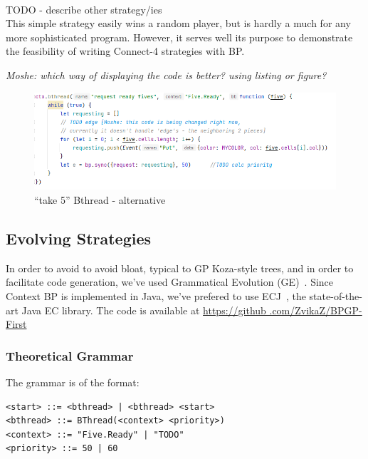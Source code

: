 \documentclass{article}
\begin{document}
    {~\\ \large TODO - describe other strategy/ies}\\

This simple strategy easily wins a random player, but is hardly a much for any more sophisticated program. However, 
it serves well its purpose to demonstrate the feasibility of writing Connect-4 strategies with BP. 

\emph{Moshe: which way of displaying the code is better? using \emph{listing} or \emph{figure}?}



\begin{figure}[h]
    \includegraphics[width=\textwidth]{five_bt}
    \caption{``take 5'' Bthread - alternative}
    \label{fig:take-5-bt-fig}
\end{figure}


\subsection{Evolving Strategies}
In order to avoid to avoid bloat, typical to GP Koza-style trees, and in order to facilitate code generation, we've
used Grammatical Evolution (GE)~\cite{ONeill2001}. Since Context BP is implemented in Java, we've prefered to use
ECJ~\cite{Luke1998ECJSoftware}, the state-of-the-art Java EC library. The code is available at \url{https://github
.com/ZvikaZ/BPGP-First}

\subsubsection{Theoretical Grammar}

The grammar is of the format:
\begin{verbatim}
<start> ::= <bthread> | <bthread> <start>
<bthread> ::= BThread(<context> <priority>)
<context> ::= "Five.Ready" | "TODO"
<priority> ::= 50 | 60
\end{verbatim}
\end{document}
